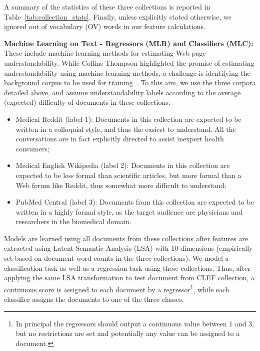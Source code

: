A summary of the statistics of these three collections is reported in Table~\ref{tab:collection_stats}. 
Finally, unless explicitly stated otherwise, we ignored out of vocabulary (OV) words in our feature calculations.






\textbf{Machine Learning on Text - Regressors (MLR) and Classifiers (MLC):} These include machine learning methods for estimating Web page understandability. While Collins-Thompson highlighted the promise of estimating understandability using machine learning methods, a challenge is identifying the background corpus to be used for training~\cite{collins2014computational}. To this aim, we use the three corpora detailed above, and assume understandability labels according to the average (expected) difficulty of documents in these collections:

\begin{itemize}
    \item Medical Reddit (label 1): Documents in this collection are expected to be written in a colloquial style, and thus the easiest to understand. All the conversations are in fact explicitly directed to assist inexpert health consumers;
    \item Medical English Wikipedia (label 2): Documents in this collection are expected to be less formal than scientific articles, but more formal than a Web forum like Reddit, thus somewhat more difficult to understand;
    \item PubMed Central (label 3): Documents from this collection are expected to be written in a highly formal style, as the target audience are physicians and researchers in the biomedical domain.
\end{itemize}

Models are learned using all documents from these collections after features are extracted using Latent Semantic Analysis (LSA) with 10 dimensions (empirically set based on document word counts in the three collections). We model a classification task as well as a regression task using these collections. Thus, after applying the same LSA transformation to test document from CLEF collection, a continuous score is assigned to each document by a regressor\footnote{In principal the regressors should output a continuous value between 1 and 3, but no restrictions are set and potentially any value can be assigned to a document.}, while each classifier assigns the documents to one of the three classes.

